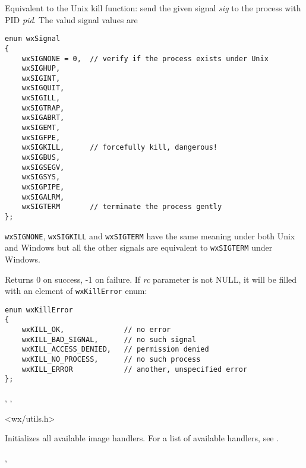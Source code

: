 \label{wxkill}


Equivalent to the Unix kill function: send the given signal {\it sig} to the
process with PID {\it pid}. The valud signal values are

\begin{verbatim}
enum wxSignal
{
    wxSIGNONE = 0,  // verify if the process exists under Unix
    wxSIGHUP,
    wxSIGINT,
    wxSIGQUIT,
    wxSIGILL,
    wxSIGTRAP,
    wxSIGABRT,
    wxSIGEMT,
    wxSIGFPE,
    wxSIGKILL,      // forcefully kill, dangerous!
    wxSIGBUS,
    wxSIGSEGV,
    wxSIGSYS,
    wxSIGPIPE,
    wxSIGALRM,
    wxSIGTERM       // terminate the process gently
};
\end{verbatim}

{\tt wxSIGNONE}, {\tt wxSIGKILL} and {\tt wxSIGTERM} have the same meaning
under both Unix and Windows but all the other signals are equivalent to 
{\tt wxSIGTERM} under Windows.

Returns 0 on success, -1 on failure. If {\it rc} parameter is not NULL, it will
be filled with an element of {\tt wxKillError} enum:

\begin{verbatim}
enum wxKillError
{
    wxKILL_OK,              // no error
    wxKILL_BAD_SIGNAL,      // no such signal
    wxKILL_ACCESS_DENIED,   // permission denied
    wxKILL_NO_PROCESS,      // no such process
    wxKILL_ERROR            // another, unspecified error
};
\end{verbatim}


,\rtfsp
{},\rtfsp
{}


<wx/utils.h>

\label{wxinitallimagehandlers}


Initializes all available image handlers. For a list of available handlers,
see .


, 


